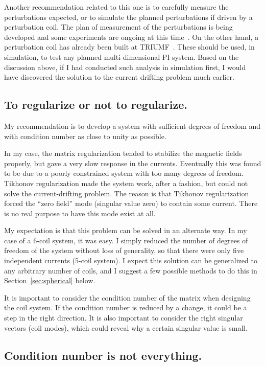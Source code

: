 Another recommendation related to this one is to carefully measure the perturbations expected, or to simulate the planned perturbations if driven by a perturbation coil. The plan of measurement of the perturbations is being developed and some experiments are ongoing at this time~\cite{beapriv}. On the other hand, a perturbation coil has already been built at TRIUMF~\cite{smith,cudmore}. These should be used, in simulation, to test any planned multi-dimensional PI system.  Based on the discussion above, if I had conducted such analysis in simulation first, I would have discovered the solution to the current drifting problem much earlier.


\subsection{To regularize or not to regularize.}
 
My recommendation is to develop a system with sufficient degrees of freedom and with condition number as close to unity as possible. 

In my case, the matrix regularization tended to stabilize the magnetic fields properly, but gave a very slow response in the currents. Eventually this was found to be due to a poorly constrained system with too many degrees of freedom. Tikhonov regularization made the system work, after a fashion, but could not solve the current-drifting problem. The reason is that Tikhonov regularization forced the ``zero field'' mode (singular value zero) to contain some current. There is no real purpose to have this mode exist at all.

My expectation is that this problem can be solved in an alternate way. In my case of a 6-coil system, it was easy. I simply reduced the number of degrees of freedom of the system without loss of generality, so that there were only five independent currents (5-coil system). I expect this solution can be generalized to any arbitrary number of coils, and I suggest a few possible methods to do this in Section~\ref{sec:spherical} below.

It is important to consider the condition number of the matrix when designing the coil system.  If the condition number is reduced by a change, it could be a step in the right direction.  It is also important to consider the right singular vectors (coil modes), which could reveal why a certain singular value is small.


\subsection{Condition number is not everything.}

